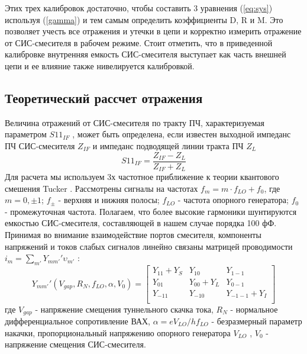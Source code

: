 \documentclass[a4paper]{article}
\begin{document}
Этих трех калибровок достаточно, чтобы составить 3 уравнения (\ref{eq:sys}) используя (\ref{gamma}) и тем самым определить коэффициенты D, R и M. Это позволяет учесть все отражения и 
утечки в цепи и корректно измерить отражение от СИС-смесителя в рабочем режиме. Стоит отметить, что в приведенной калибровке внутренняя емкость СИС-смесителя выступает 
как часть внешней цепи и ее влияние также нивелируется калибровкой.

\subsection{Теоретический рассчет отражения}

Величина отражений от СИС-смесителя по тракту ПЧ, характеризуемая параметром $S11_{IF}$  \cite{Kooi}, может быть определена, если известен выходной импеданс ПЧ СИС-смесителя $Z_{IF}$  и импеданс подводящей линии тракта ПЧ $Z_L$
\begin{equation}
    S11_{IF} = \frac{Z_{IF} - Z_L}{Z_{IF} + Z_L}
    \label{s11}
\end{equation}
Для расчета  мы используем 3х частотное приближение к теории квантового смешения Tucker \cite{Tucker}. Рассмотрены сигналы на частотах 
$f_m = m \cdot f_{LO} + f_0$, 
где $m = 0, \pm 1$; $f_{\pm}$  - верхняя и нижняя полосы; $f_{LO}$ - частота опорного генератора; $f_0$ - промежуточная частота. Полагаем, что более высокие гармоники шунтируются емкостью СИС-смесителя, составляющей в нашем случае порядка 100 фФ.
Принимая во внимание взаимодействие портов смесителя, компоненты напряжений и токов слабых сигналов линейно связаны матрицей проводимости $i_m = \sum_{m'} Y_{mm'}' \upsilon_{m'} $ :
\begin{equation}
    Y_{mm'}' (V_{gap}, R_N, f_{LO}, \alpha, V_0) = 
    \begin{bmatrix}
        Y_{11} + Y_{S} & Y_{10} & Y_{1-1}  \\
        Y_{01} & Y_{00} + Y_L & Y_{0-1}   \\
        Y_{-11} & Y_{-10} & Y_{-1-1}+Y_I  \\
    \end{bmatrix}
    \label{Y_mm}
\end{equation}
где $V_{gap}$ - напряжение смещения туннельного скачка тока, $R_N$ - нормальное дифференциальное сопротивление ВАХ, $\alpha = e V_{LO} / h f_{LO}$ - безразмерный параметр накачки, 
пропорциональный напряжению опорного генератора $V_{LO}$ , $V_0$ - напряжение смещения СИС-смесителя.
\par
\end{document}
